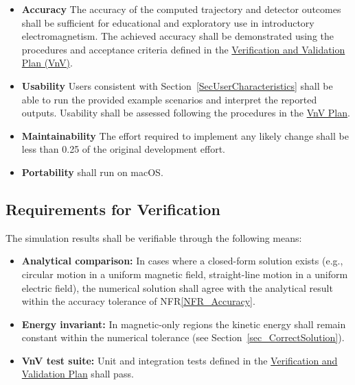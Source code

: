 \documentclass[12pt]{article}
\newcounter{nfrnum} %
\newcommand{\nfrref}[1]{NFR\ref{#1}}
\begin{document}
\noindent \begin{itemize}

\item[NFR\refstepcounter{nfrnum}\thenfrnum \label{NFR_Accuracy}:]
\textbf{Accuracy} The accuracy of the computed trajectory and detector outcomes
shall be sufficient for educational and exploratory use in introductory
electromagnetism. The achieved accuracy shall be demonstrated using the
procedures and acceptance criteria defined in the
\href{https://joezzg.github.io/CAS741/VnVPlan/VnVPlan.pdf}{Verification and Validation Plan (VnV)}.

\item[NFR\refstepcounter{nfrnum}\thenfrnum \label{NFR_Usability}:]
\textbf{Usability} Users consistent with Section~\ref{SecUserCharacteristics}
shall be able to run the provided example scenarios and interpret the reported
outputs. Usability shall be assessed following the procedures in the
\href{https://joezzg.github.io/CAS741/VnVPlan/VnVPlan.pdf}{VnV Plan}.

\item[NFR\refstepcounter{nfrnum}\thenfrnum \label{NFR_Maintainability}:]
\textbf{Maintainability} The effort required to implement any likely change shall be
less than 0.25 of the original development effort.

\item[NFR\refstepcounter{nfrnum}\thenfrnum \label{NFR_Portability}:]
\textbf{Portability} \progname{} shall run on macOS.


\end{itemize}

\subsection{Requirements for Verification} \label{SecReqVerification}

The simulation results shall be verifiable through the following means:

\begin{itemize}
\item \textbf{Analytical comparison:} In cases where a closed-form solution
  exists (e.g., circular motion in a uniform magnetic field, straight-line motion
  in a uniform electric field), the numerical solution shall agree with the
  analytical result within the accuracy tolerance of \nfrref{NFR_Accuracy}.
\item \textbf{Energy invariant:} In magnetic-only regions the kinetic energy shall
  remain constant within the numerical tolerance (see
  Section~\ref{sec_CorrectSolution}).
\item \textbf{VnV test suite:} Unit and integration tests defined in the
  \href{../../VnVPlan/VnVPlan.pdf}{Verification and Validation Plan} shall pass.
\end{itemize}
\end{document}
